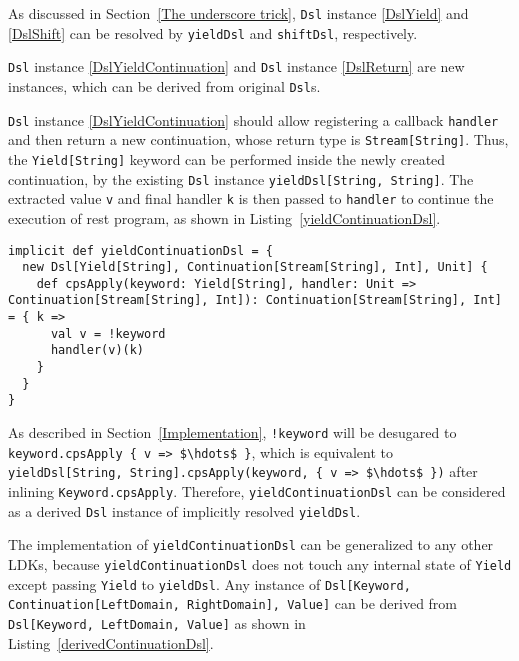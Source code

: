 As discussed in Section~\ref{The underscore trick}, \lstinline{Dsl} instance \ref{DslYield} and \ref{DslShift} can be resolved by \lstinline{yieldDsl} and \lstinline{shiftDsl}, respectively.

\lstinline{Dsl} instance \ref{DslYieldContinuation} and \lstinline{Dsl} instance \ref{DslReturn} are new instances, which can be derived from original \lstinline{Dsl}s.

\lstinline{Dsl} instance \ref{DslYieldContinuation} should allow registering a callback \lstinline{handler} and then return a new continuation, whose return type is \lstinline{Stream[String]}. Thus, the \lstinline{Yield[String]} keyword can be performed inside the newly created continuation, by the existing \lstinline{Dsl} instance \lstinline{yieldDsl[String, String]}. The extracted value \lstinline{v} and final handler \lstinline{k} is then passed to \lstinline{handler} to continue the execution of rest program, as shown in Listing~\ref{yieldContinuationDsl}.

\begin{lstlisting}[caption={The derived \lstinline{Dsl} instance for \lstinline{Yield} LDK, which can be used in a \lstinline{Continuation}},label={yieldContinuationDsl}]
implicit def yieldContinuationDsl = {
  new Dsl[Yield[String], Continuation[Stream[String], Int], Unit] {
    def cpsApply(keyword: Yield[String], handler: Unit => Continuation[Stream[String], Int]): Continuation[Stream[String], Int] = { k =>
      val v = !keyword
      handler(v)(k)
    }
  }
}
\end{lstlisting}

As described in Section~\ref{Implementation}, \lstinline{!keyword} will be desugared to \lstinline[mathescape=true]|keyword.cpsApply { v => $\hdots$ }|, which is equivalent to \lstinline[mathescape=true]|yieldDsl[String, String].cpsApply(keyword, { v => $\hdots$ })| after inlining \lstinline{Keyword.cpsApply}. Therefore, \lstinline{yieldContinuationDsl} can be considered as a derived \lstinline{Dsl} instance of implicitly resolved \lstinline{yieldDsl}.

The implementation of \lstinline{yieldContinuationDsl} can be generalized to any other LDKs, because \lstinline{yieldContinuationDsl} does not touch any internal state of \lstinline{Yield} except passing \lstinline{Yield} to \lstinline{yieldDsl}. Any instance of \lstinline{Dsl[Keyword, Continuation[LeftDomain, RightDomain], Value]} can be derived from \lstinline{Dsl[Keyword, LeftDomain, Value]} as shown in Listing~\ref{derivedContinuationDsl}.

